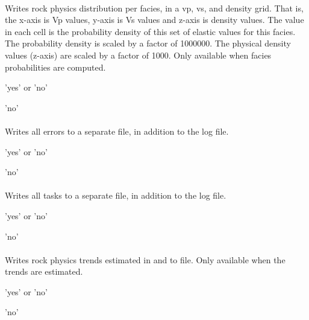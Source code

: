 \paragraph{}
 \slist
   \item \Description Writes rock physics distribution per facies, in a vp, vs, and density grid. That is, the x-axis is Vp values, y-axis is Vs values and z-axis is density values. The value in each cell is the probability density of this set of elastic values for this facies. The probability density is scaled by a factor of 1000000. The physical density values (z-axis) are scaled by a factor of 1000. Only available when facies probabilities are computed.
   \item \Argument 'yes' or 'no'
   \item \Default 'no'
\elist

\paragraph{}
 \slist
   \item \Description Writes all errors to a separate file, in
   addition to the log file.
   \item \Argument 'yes' or 'no'
   \item \Default 'no'
\elist

\paragraph{}
 \slist
   \item \Description Writes all tasks to a separate file, in
   addition to the log file.
   \item \Argument 'yes' or 'no'
   \item \Default 'no'
\elist

\paragraph{}
 \slist
   \item \Description Writes rock physics trends estimated in  and  to file. Only available when the trends are estimated.
   \item \Argument 'yes' or 'no'
   \item \Default 'no'
\elist


